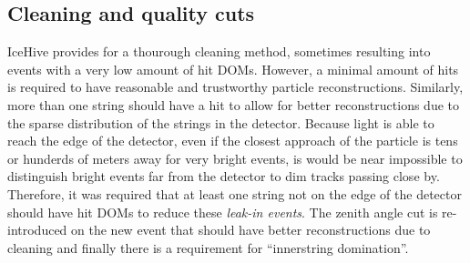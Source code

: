 \begin{table}[]
\caption{Overview of quality cuts in Level 4.}
\label{tab:level4}
\end{table}

\subsection{Cleaning and quality cuts}
\noindent IceHive provides for a thourough cleaning method, sometimes resulting into events with a very low amount of hit DOMs. However, a minimal amount of hits is required to have reasonable and trustworthy particle reconstructions. Similarly, more than one string should have a hit to allow for better reconstructions due to the sparse distribution of the strings in the detector. Because light is able to reach the edge of the detector, even if the closest approach of the particle is tens or hunderds of meters away for very bright events, is would be near impossible to distinguish bright events far from the detector to dim tracks passing close by. Therefore, it was required that at least one string not on the edge of the detector should have hit DOMs to reduce these \textit{leak-in events}.
The zenith angle cut is re-introduced on the new event that should have better reconstructions due to cleaning and finally there is a requirement for ``innerstring domination''.

